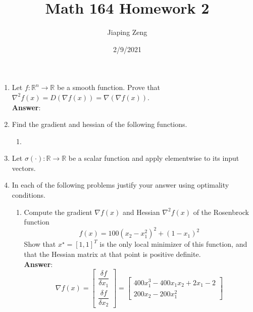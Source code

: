\documentclass{article}
\title{Math 164 Homework 2}
\date{2/9/2021}
\author{Jiaping Zeng}
\begin{document}
\maketitle

\begin{enumerate}
    \item Let $f:\mathbb{R}^n\rightarrow\mathbb{R}$ be a smooth function. Prove that $\nabla^2f(x)=D(\nabla f(x))=\nabla(\nabla f(x))$.\\
          \textbf{Answer}:
    \item Find the gradient and hessian of the following functions.
          \begin{enumerate}
              \item
          \end{enumerate}
    \item Let $\sigma(\cdot):\mathbb{R}\rightarrow\mathbb{R}$ be a scalar function and apply elementwise to its input vectors.
    \item In each of the following problems justify your answer using optimality conditions.
          \begin{enumerate}
              \item Compute the gradient $\nabla f(x)$ and Hessian $\nabla^2 f(x)$ of the Rosenbrock function \[f(x)=100(x_2-x_1^2)^2+(1-x_1)^2\] Show that $x^\star=[1,1]^T$ is the only local minimizer of this function, and that the Hessian matrix at that point is positive definite.\\
                    \textbf{Answer}: \[
                        \nabla f(x)=\begin{bmatrix}
                            \dfrac{\delta f}{\delta x_1} \\\dfrac{\delta f}{\delta x_2}
                        \end{bmatrix}=\begin{bmatrix}
                            400x_1^3-400x_1x_2+2x_1-2 \\
                            200x_2-200x_1^2
                        \end{bmatrix}
                    \]
          \end{enumerate}
\end{enumerate}
\end{document}
